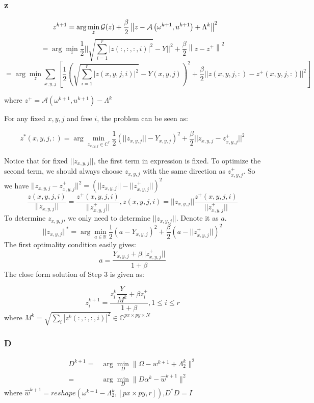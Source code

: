 \documentclass{article}
\numberwithin{equation}{section}
\begin{document}
 \subsubsection{z}
 $$
  \quad z^{k+1}=\arg \min _{z} \mathcal{G}(z)+\frac{\beta}{2}\left\|z-\mathcal{A}\left(\omega^{k+1}, u^{k+1}\right)+\Lambda^{k}\right\|^{2}\\
  $$
  $$
  =\arg \min _{z} \frac{1}{2}|| \sqrt{ \sum_{i=1}^{r} |z(:,:,:,i)|^2} - Y||^2+\frac{\beta}{2}\left\|z - z^+\right\|^{2}
 $$
 $$
 = \arg \min _{z} \sum_{x,y,j} [\frac{1}{2} ( \sqrt{ \sum_{i=1}^{r} |z(x,y,j,i)|^2} - Y(x,y,j) )^2 +
  \frac{\beta}{2}||z(x,y,j,:) - z^+(x,y,j,:)||^2 ]
 $$
 
 where $z^+ = \mathcal{A}\left(\omega^{k+1}, u^{k+1}\right) - \Lambda^{k}$
 
 For any fixed $x,y,j$ and free $i$, the problem can be seen as:
 
 $$
 z^*(x,y,j,:) = \arg \min_{z_{x,y,j} \in \mathbb{C}^{r}} \frac{1}{2} ( ||z_{x,y,j}|| - Y_{x,y,j} )^2
 + \frac{\beta}{2} ||z_{x,y,j} - z_{x,y,j}^+||^2
 $$
 
 Notice that for fixed $||z_{x,y,j}||$, the first term in expression is fixed. To optimize the second term, we should always choose $z_{x,y,j}$ with the same direction as $z_{x,y,j}^+$. So we have  $||z_{x,y,j} - z_{x,y,j}^+||^2 = (||z_{x,y,j}|| - ||z_{x,y,j}^+||)^2$
 $$
  \dfrac{z(x,y,j,i)}{||z_{x,y,j}||} = \dfrac{z^+(x,y,j,i)}{||z_{x,y,j}^+||}, z(x,y,j,i) = ||z_{x,y,j}||\dfrac{z^+(x,y,j,i)}{||z_{x,y,j}^+||}
 $$
 To determine $z_{x,y,j}$, we only need to determine $||z_{x,y,j}||$. Denote it as $a$.
 $$
 ||z_{x,y,j}||^* = \arg \min_{a \in \mathbb{R}} \frac{1}{2}(a - Y_{x,y,j})^2 + \dfrac{\beta}{2}
 (a - ||z_{x,y,j}^+||)^2
 $$
 The first optimality condition easily gives:
 $$
 a = \dfrac{Y_{x,y,j} + \beta ||z_{x,y,j}^+||}{1 + \beta}
 $$
 The  close form solution of Step 3 is given as:
 
 \begin{equation}
 z_i^{k+1} = \dfrac{z_i^k \dfrac{Y}{ M^k} + \beta z_i^+}{1+\beta}, 1 \leq i \leq r
 \label{zup}
 \end{equation}
 where $M^k =\sqrt{\sum_i |z^k(:,:,:,i)|^2} \in \mathbb{C}^{px \times py \times N}$
 
\subsubsection{D}

$$
\begin{aligned}
D^{k+1} =& \arg \min_{D} \| \Omega -  w^{k+1} + \Lambda_2^{k}\|^{2} \\
=& \arg \min_{D} \| D\alpha^k - \hat {w}^{k+1}\|^{2} 
\end{aligned}
$$
where $\hat {w}^{k+1} = reshape( \omega^{k+1} - \Lambda_2^{k},[px\times py,r])$,$D^*D=I$
\end{document}
